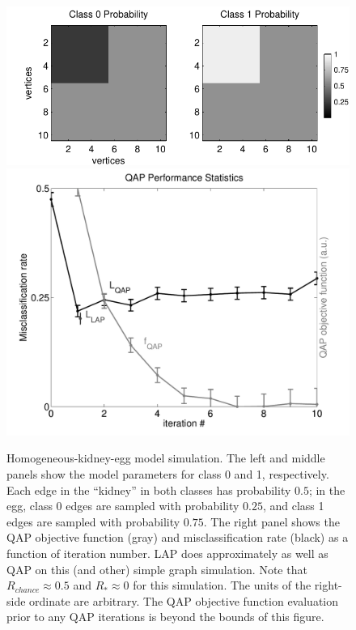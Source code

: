 \documentclass[10pt,journal,cspaper,compsoc]{IEEEtran}
\begin{document}
\begin{figure}[htbp]
	\centering			
	\includegraphics[width=1.0\linewidth]{../figs/homo_kidney_egg_model}
	\includegraphics[width=1.0\linewidth]{../figs/homo_kidney_egg_performance}
	\caption{Homogeneous-kidney-egg model simulation. The left and middle panels show the model parameters for class 0 and 1, respectively.  Each edge in the ``kidney'' in both classes has probability $0.5$; in the egg, class 0 edges are sampled with probability $0.25$, and class 1 edges are sampled with probability $0.75$. The right panel shows the QAP objective function (gray) and misclassification rate (black) as a function of iteration number. LAP does approximately as well as QAP on this (and other) simple graph simulation.  Note that $R_{chance}\approx 0.5$ and $R_* \approx 0$ for this simulation. The units of the right-side ordinate are arbitrary. The QAP objective function evaluation prior to any QAP iterations is beyond the bounds of this figure.}
	\label{fig:homo}
\end{figure}
\end{document}
